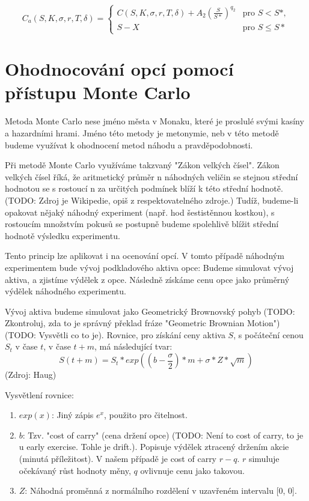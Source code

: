 \documentclass[male,czech,api_bc]{kitheses}
\begin{document}
  \begin{equation}
    C_a(S, K, \sigma, r, T, \delta) = 
    \begin{cases}
      C(S, K, \sigma, r, T, \delta) + A_2\left(\frac{S}{S*}\right)^{q_2} & \text{pro } S < S*, \\
      S - X & \text{pro } S \le S*
    \end{cases}
  \end{equation}

  \section{Ohodnocování opcí pomocí přístupu Monte Carlo}

  Metoda Monte Carlo nese jméno města v Monaku, které je proslulé svými kasíny a hazardními hrami. Jméno této metody je metonymie, neb v této metodě budeme využívat k ohodnocení metod náhodu a pravděpodobnosti.

  Při metodě Monte Carlo využíváme takzvaný "Zákon velkých čísel". Zákon velkých čísel říká, že aritmetický průměr n náhodných veličin se stejnou střední hodnotou se s rostoucí n za určitých podmínek blíží k této střední hodnotě. (TODO: Zdroj je Wikipedie, opiš z respektovatelného zdroje.) Tudíž, budeme-li opakovat nějaký náhodný experiment (např. hod šestistěnnou kostkou), s rostoucím množstvím pokusů se postupně budeme spolehlivě blížit střední hodnotě výsledku experimentu.

  Tento princip lze aplikovat i na ocenování opcí. V tomto případě náhodným experimentem bude vývoj podkladového aktiva opce: Budeme simulovat vývoj aktiva, a zjistíme výdělek z opce. Následně získáme cenu opce jako průměrný výdělek náhodného experimentu.

  Vývoj aktiva budeme simulovat jako Geometrický Brownovský pohyb (TODO: Zkontroluj, zda to je správný překlad fráze "Geometric Brownian Motion") (TODO: Vysvětli co to je). Rovnice, pro získání ceny aktiva $S$, s počáteční cenou $S_t$ v čase $t$, v čase $t + m$, má následující tvar:
  $$ S(t + m) = S_t * exp((b - \frac{\sigma}{2}) * m + \sigma * Z * \sqrt{m}) $$ (Zdroj: Haug)
  
  Vysvětlení rovnice:
  \begin{enumerate}
    \item{\textbf{$exp(x)$}: Jiný zápis $e^x$, použito pro čitelnost.}
    \item{\textbf{$b$}: Tzv. "cost of carry" (cena držení opce) (TODO: Není to cost of carry, to je u early exercise. Tohle je drift.). Popisuje výdělek ztracený držením akcie (minutá příležitost). V našem případě je cost of carry $r - q$. $r$ simuluje očekávaný růst hodnoty měny, $q$ ovlivnuje cenu jako takovou.}
    \item{\textbf{$Z$}: Náhodná proměnná z normálního rozdělení v uzavřeném intervalu [0, 0].}
  \end{enumerate}
\end{document}
